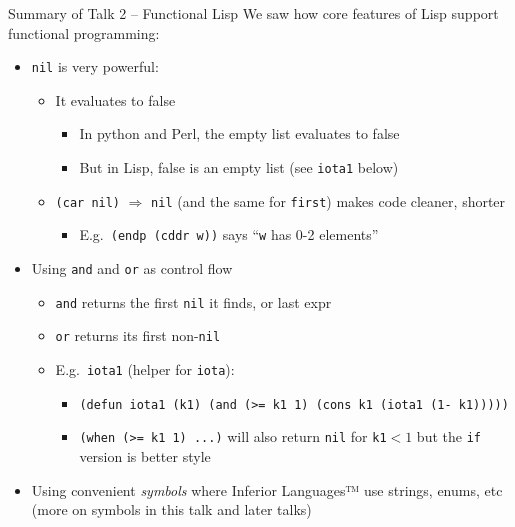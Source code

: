 \documentclass[presentation]{beamer}
\begin{document}
\begin{frame}{Summary of Talk 2 -- Functional Lisp}
  We saw how core features of Lisp support functional programming:
  \begin{itemize}
  \item \texttt{nil} is very powerful:
    \begin{itemize}
    \item It evaluates to false
      \begin{itemize}
      \item In python and Perl, the empty list evaluates to false
      \item But in Lisp, false is an empty list (see \texttt{iota1} below)
      \end{itemize}
    \item \texttt{(car nil)} $\Rightarrow$ \texttt{nil} (and the same for \texttt{first}) makes code cleaner, shorter
      \begin{itemize}
      \item E.g.\ \texttt{(endp (cddr w))} says ``\texttt{w} has 0-2 elements''
      \end{itemize}
    \end{itemize}
  \item Using \texttt{and} and \texttt{or} as control flow
    \begin{itemize}
    \item \texttt{and} returns the first \texttt{nil} it finds, or last expr
    \item \texttt{or} returns its first non-\texttt{nil}
  \item E.g.\ \texttt{iota1} (helper for \texttt{iota}):
    \begin{itemize}
    \item \texttt{(defun iota1 (k1) (and (>= k1 1) (cons k1 (iota1 (1- k1)))))}
    \item \texttt{(when (>= k1 1) ...)} will also return \texttt{nil} for \texttt{k1}$<1$  but the \texttt{if} version is better style
    \end{itemize}
    \end{itemize}
  \item Using convenient \emph{symbols} where Inferior Languages™ use strings, enums, etc (more on symbols in this talk and later talks)
  \end{itemize}

\end{frame}
\end{document}
